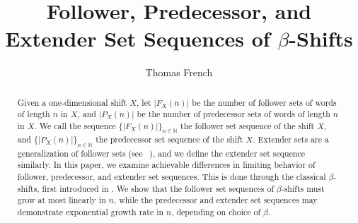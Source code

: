 \documentclass{amsart}
\theoremstyle{definition}
\numberwithin{equation}{section}
\begin{document}
\title[Follower, Predecessor, and Extender Set Sequences of $\beta$-Shifts]{Follower, Predecessor, and Extender Set Sequences of $\beta$-Shifts}

\begin{abstract}

Given a one-dimensional shift $X$, let $|F_X(n)|$ be the number of follower sets of words of length $n$ in $X$, and $|P_X(n)|$ be the number of predecessor sets of words of length $n$ in $X$. We call the sequence $\{|F_X(n)|\}_{n \in \mathbb{N}}$ the follower set sequence of the shift $X$, and $\{|P_X(n)|\}_{n \in \mathbb{N}}$ the predecessor set sequence of the shift $X$. Extender sets are a generalization of follower sets (see ~\cite{KassMadden}), and we define the extender set sequence similarly. In this paper, we examine achievable differences in limiting behavior of follower, predecessor, and extender set sequences. This is done through the classical $\beta$-shifts, first introduced in \cite{Renyi}. We show that the follower set sequences of $\beta$-shifts must grow at most linearly in $n$, while the predecessor and extender set sequences may demonstrate exponential growth rate in $n$, depending on choice of $\beta$.
\end{abstract}

\date{}
\author{Thomas French}
\address{Thomas French\\
Department of Mathematics\\
University of Denver\\
2280 S. Vine St.\\
Denver, CO 80208}

\maketitle
\end{document}
